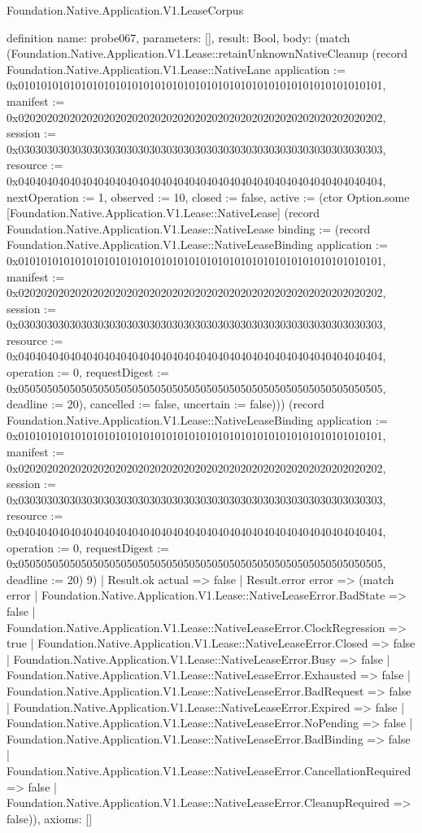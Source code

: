 \begin{lexlean}{Foundation.Native.Application.V1.LeaseCorpus}
\begin{semanticmodule}
definition{
  name: probe067,
  parameters: [],
  result: Bool,
  body: (match (Foundation.Native.Application.V1.Lease::retainUnknownNativeCleanup (record Foundation.Native.Application.V1.Lease::NativeLane {application := 0x0101010101010101010101010101010101010101010101010101010101010101, manifest := 0x0202020202020202020202020202020202020202020202020202020202020202, session := 0x0303030303030303030303030303030303030303030303030303030303030303, resource := 0x0404040404040404040404040404040404040404040404040404040404040404, nextOperation := 1, observed := 10, closed := false, active := (ctor Option.some [Foundation.Native.Application.V1.Lease::NativeLease] (record Foundation.Native.Application.V1.Lease::NativeLease {binding := (record Foundation.Native.Application.V1.Lease::NativeLeaseBinding {application := 0x0101010101010101010101010101010101010101010101010101010101010101, manifest := 0x0202020202020202020202020202020202020202020202020202020202020202, session := 0x0303030303030303030303030303030303030303030303030303030303030303, resource := 0x0404040404040404040404040404040404040404040404040404040404040404, operation := 0, requestDigest := 0x0505050505050505050505050505050505050505050505050505050505050505, deadline := 20}), cancelled := false, uncertain := false}))}) (record Foundation.Native.Application.V1.Lease::NativeLeaseBinding {application := 0x0101010101010101010101010101010101010101010101010101010101010101, manifest := 0x0202020202020202020202020202020202020202020202020202020202020202, session := 0x0303030303030303030303030303030303030303030303030303030303030303, resource := 0x0404040404040404040404040404040404040404040404040404040404040404, operation := 0, requestDigest := 0x0505050505050505050505050505050505050505050505050505050505050505, deadline := 20}) 9)
    | Result.ok actual => false
    | Result.error error => (match error
      | Foundation.Native.Application.V1.Lease::NativeLeaseError.BadState => false
      | Foundation.Native.Application.V1.Lease::NativeLeaseError.ClockRegression => true
      | Foundation.Native.Application.V1.Lease::NativeLeaseError.Closed => false
      | Foundation.Native.Application.V1.Lease::NativeLeaseError.Busy => false
      | Foundation.Native.Application.V1.Lease::NativeLeaseError.Exhausted => false
      | Foundation.Native.Application.V1.Lease::NativeLeaseError.BadRequest => false
      | Foundation.Native.Application.V1.Lease::NativeLeaseError.Expired => false
      | Foundation.Native.Application.V1.Lease::NativeLeaseError.NoPending => false
      | Foundation.Native.Application.V1.Lease::NativeLeaseError.BadBinding => false
      | Foundation.Native.Application.V1.Lease::NativeLeaseError.CancellationRequired => false
      | Foundation.Native.Application.V1.Lease::NativeLeaseError.CleanupRequired => false)),
  axioms: []
}


\end{semanticmodule}
\end{lexlean}
